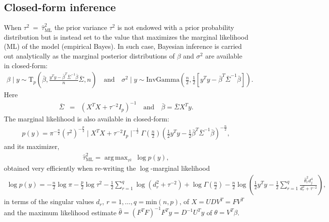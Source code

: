 \documentclass[nojss]{jss}
\DeclareMathOperator*{\argmax}{arg\,max}
\begin{document}
\subsection{Closed-form inference}

When $\tau^2 \ =\  \hat{\tau}_{\mathrm{ML}}^2$ the prior variance $\tau^2$ is
not endowed with a prior probability distribution but is instead set to the
value that maximizes the marginal likelihood (ML) of the model (empirical Bayes).
In such case, Bayesian inference is carried out analytically as the marginal
posterior distributions of $\beta$ and $\sigma^2$ are available in closed-form:
\begin{eqnarray*}
\beta \mid y \sim \mathrm{T}_p \left( \bar{\beta} ,  \frac{y^T y - \bar{\beta}^T \bar{\Sigma}^{-1} \bar{\beta}}{n} \bar{\Sigma}, n\right) \quad \mathrm{and} \quad \sigma^2 \mid y \sim \mathrm{InvGamma} \left( \frac{n}{2} , \frac{1}{2} \left[ y^T y - \bar{\beta}^T \bar{\Sigma}^{-1} \bar{\beta} \right] \right).
\end{eqnarray*}
Here
\begin{eqnarray*}
  \bar{\Sigma} &=& \left( X^T X + \tau^{-2} I_p\right)^{-1} \quad \text{and}\quad \bar{\beta} = \bar{\Sigma} X^T y.
\end{eqnarray*}
The marginal likelihood is also available in closed-form:
\begin{eqnarray*}
p(y) = \pi^{-\frac{n}{2}} \left( \tau^2\right)^{-\frac{p}{2}} \mid X^T X + \tau^{-2} I_p \mid^{-\frac{1}{2}} \Gamma\left( \frac{n}{2} \right) \left( \frac{1}{2} y^T y - \frac{1}{2} \bar{\beta}^T \bar{\Sigma}^{-1} \bar{\beta} \right)^{-\frac{n}{2}},
\end{eqnarray*}
and its maximizer,
\begin{eqnarray*}
\hat{\tau}_{\mathrm{ML}}^2 = \argmax_{\tau^2}\ \log p(y),
\end{eqnarray*}
obtained very efficiently \citep{karabatsos2018} when re-writing the
$\log$-marginal likelihood
\begin{eqnarray*}
\log p(y) = -\frac{n}{2} \log\pi - \frac{p}{2} \log\tau^2 - \frac{1}{2} \sum_{r=1}^{q}{\log(d_r^2 + \tau^{-2})} +\log\Gamma\left( \frac{n}{2}\right) - \frac{n}{2} \log\left( \frac{1}{2}y^Ty - \frac{1}{2}\sum_{r=1}^{q}{\frac{\hat{\theta}_r^2 d_j^4}{d_r^2 + \tau^{-2}}} \right),
\end{eqnarray*}
in terms of the singular values $d_r$, $r=1, \ldots, q=\mathrm{min}(n,p)$, of
$X=UDV^T=F V^T$ and the maximum likelihood estimate
$\hat{\theta} = ( F^T F )^{-1} F^T y=D^{-1}U^T y$ of $\theta = V^T \beta$.
\end{document}
